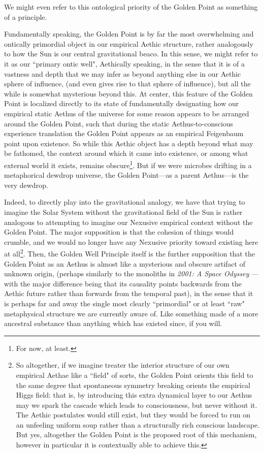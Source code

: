 \begin{enumerate}
    We might even refer to this ontological priority of the Golden Point as something of a principle.
    \begin{prince}
        Fundamentally speaking, the Golden Point is by far the most overwhelming and ontically primordial object in our empirical Aethic structure, rather analogously to how the Sun is our central gravitational beaco. In this sense, we might refer to it as our ``primary ontic well", Aethically speaking, in the sense that it is of a vastness and depth that we may infer as beyond anything else in our Aethic sphere of influence, (and even gives rise to that sphere of influence), but all the while is somewhat mysterious beyond this. At center, this feature of the Golden Point is localized directly to its state of fundamentally designating how our empirical static Aethus of the universe for some reason appears to be arranged around the Golden Point, such that during the static Aethus-to-conscious experience translation the Golden Point appears as an empirical Feigenbaum point upon existence. So while this Aethic object has a depth beyond what may be fathomed, the context around which it came into existence, or among what external world it exists, remains obscure\footnote{For now, at least.}. But if we were microbes drifting in a metaphorical dewdrop universe, the Golden Point---as a parent Aethus---is the very dewdrop. 

        Indeed, to directly play into the gravitational analogy, we have that trying to imagine the Solar System without the gravitational field of the Sun is rather analogous to attempting to imagine our Nexusive empirical context without the Golden Point. The major supposition is that the cohesion of things would crumble, and we would no longer have any Nexusive priority toward existing here at all\footnote{So altogether, if we imagine treater the interior structure of our own empirical Aethae like a ``field" of sorts, the Golden Point orients this field to the same degree that spontaneous symmetry breaking orients the empirical Higgs field: that is, by introducing this extra dynamical layer to our Aethus may we spark the cascade which leads to consciousness, but never without it. The Aethic postulates would still exist, but they would be forced to run on an unfeeling uniform soup rather than a structurally rich conscious landscape. But yes, altogether the Golden Point is the proposed root of this mechanism, however in particular it is contextually able to achieve this.}. Then, the Golden Well Principle itself is the further supposition that the Golden Point as an Aethus is almost like a mysterious and obscure artifact of unknown origin, (perhaps similarly to the monoliths in \textit{2001: A Space Odyssey} \cite{2001spaceodyssey}---with the major difference being that its causality points backwards from the Aethic future rather than forwards from the temporal past), in the sense that it is perhaps far and away the single most clearly ``primordial" or at least ``raw" metaphysical structure we are currently aware of. Like something made of a more ancestral substance than anything which has existed since, if you will. 
    \end{prince}


\end{enumerate}
